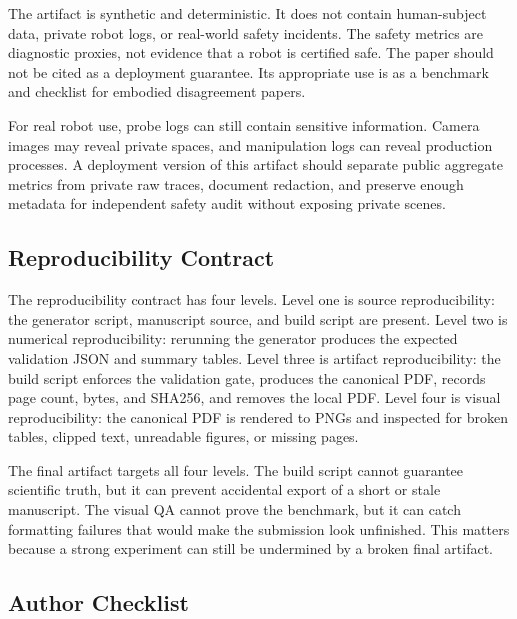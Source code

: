 \documentclass{article}
\begin{document}
The artifact is synthetic and deterministic. It does not contain human-subject data, private robot logs, or real-world safety incidents. The safety metrics are diagnostic proxies, not evidence that a robot is certified safe. The paper should not be cited as a deployment guarantee. Its appropriate use is as a benchmark and checklist for embodied disagreement papers.

For real robot use, probe logs can still contain sensitive information. Camera images may reveal private spaces, and manipulation logs can reveal production processes. A deployment version of this artifact should separate public aggregate metrics from private raw traces, document redaction, and preserve enough metadata for independent safety audit without exposing private scenes.

\subsection{Reproducibility Contract}

The reproducibility contract has four levels. Level one is source reproducibility: the generator script, manuscript source, and build script are present. Level two is numerical reproducibility: rerunning the generator produces the expected validation JSON and summary tables. Level three is artifact reproducibility: the build script enforces the validation gate, produces the canonical PDF, records page count, bytes, and SHA256, and removes the local PDF. Level four is visual reproducibility: the canonical PDF is rendered to PNGs and inspected for broken tables, clipped text, unreadable figures, or missing pages.

The final artifact targets all four levels. The build script cannot guarantee scientific truth, but it can prevent accidental export of a short or stale manuscript. The visual QA cannot prove the benchmark, but it can catch formatting failures that would make the submission look unfinished. This matters because a strong experiment can still be undermined by a broken final artifact.

\subsection{Author Checklist}
\end{document}
